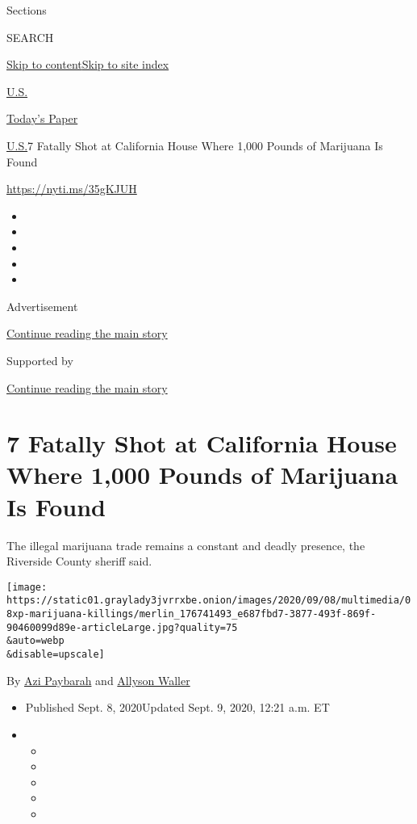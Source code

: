 Sections

SEARCH

\protect\hyperlink{site-content}{Skip to
content}\protect\hyperlink{site-index}{Skip to site index}

\href{https://www.nytimes3xbfgragh.onion/section/us}{U.S.}

\href{https://myaccount.nytimes3xbfgragh.onion/auth/login?response_type=cookie\&client_id=vi}{}

\href{https://www.nytimes3xbfgragh.onion/section/todayspaper}{Today's
Paper}

\href{/section/us}{U.S.}\textbar{}7 Fatally Shot at California House
Where 1,000 Pounds of Marijuana Is Found

\url{https://nyti.ms/35gKJUH}

\begin{itemize}
\item
\item
\item
\item
\item
\end{itemize}

Advertisement

\protect\hyperlink{after-top}{Continue reading the main story}

Supported by

\protect\hyperlink{after-sponsor}{Continue reading the main story}

\hypertarget{7-fatally-shot-at-california-house-where-1000-pounds-of-marijuana-is-found}{%
\section{7 Fatally Shot at California House Where 1,000 Pounds of
Marijuana Is
Found}\label{7-fatally-shot-at-california-house-where-1000-pounds-of-marijuana-is-found}}

The illegal marijuana trade remains a constant and deadly presence, the
Riverside County sheriff said.

\texttt{[image: https://static01.graylady3jvrrxbe.onion/images/2020/09/08/multimedia/08xp-marijuana-killings/merlin\_176741493\_e687fbd7-3877-493f-869f-90460099d89e-articleLarge.jpg?quality=75\\\&auto=webp\\\&disable=upscale]}

By \href{https://www.nytimes3xbfgragh.onion/by/azi-paybarah}{Azi
Paybarah} and
\href{https://www.nytimes3xbfgragh.onion/by/allyson-waller}{Allyson
Waller}

\begin{itemize}
\item
  Published Sept. 8, 2020Updated Sept. 9, 2020, 12:21 a.m. ET
\item
  \begin{itemize}
  \item
  \item
  \item
  \item
  \item
  \end{itemize}
\end{itemize}

